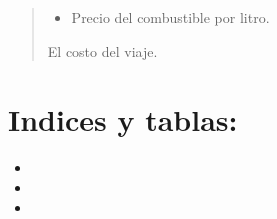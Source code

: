 \documentclass[letterpaper,10pt,spanish]{sphinxmanual}
\begin{document}
\begin{fulllineitems}
\begin{fulllineitems}
\begin{quote}
\begin{description}
\begin{itemize}
\item {} 
\sphinxAtStartPar
{} \textendash{} Precio del combustible por litro.

\end{itemize}

\sphinxAtStartPar
El costo del viaje.

\end{description}\end{quote}

\end{fulllineitems}


\end{fulllineitems}



\chapter{Indices y tablas:}
\label{\detokenize{index:indices-y-tablas}}\begin{itemize}
\item {} 
\sphinxAtStartPar
{}

\item {} 
\sphinxAtStartPar
{}

\item {} 
\sphinxAtStartPar
{}

\end{itemize}
\end{document}
